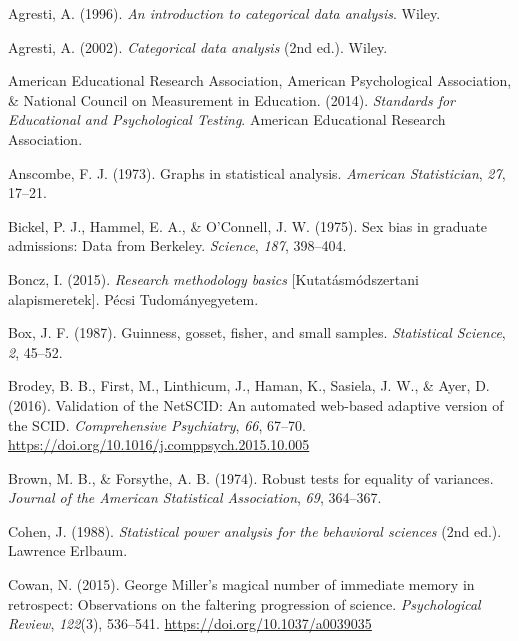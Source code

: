 \documentclass[
  11pt,
  a4paper,
  twoside,symmetric,openright]{book}
\newlength{\cslentryspacing}
\theoremstyle{break}
\theoremstyle{break}
\begin{document}
\label{refs}
\setlength{\cslentryspacing}{0em}
\begin{CSLReferences}
Agresti, A. (1996). \emph{An introduction to categorical data analysis}. Wiley.

Agresti, A. (2002). \emph{Categorical data analysis} (2nd ed.). Wiley.

American Educational Research Association, American Psychological Association, \& National Council on Measurement in Education. (2014). \emph{Standards for {Educational} and {Psychological Testing}}. {American Educational Research Association}.

Anscombe, F. J. (1973). Graphs in statistical analysis. \emph{American Statistician}, \emph{27}, 17--21.

Bickel, P. J., Hammel, E. A., \& O'Connell, J. W. (1975). Sex bias in graduate admissions: Data from {B}erkeley. \emph{Science}, \emph{187}, 398--404.

Boncz, I. (2015). \emph{{Research methodology basics}} {[}Kutatásmódszertani alapismeretek{]}. Pécsi Tudományegyetem.

Box, J. F. (1987). Guinness, gosset, fisher, and small samples. \emph{Statistical Science}, \emph{2}, 45--52.

Brodey, B. B., First, M., Linthicum, J., Haman, K., Sasiela, J. W., \& Ayer, D. (2016). Validation of the {NetSCID}: An automated web-based adaptive version of the {SCID}. \emph{Comprehensive Psychiatry}, \emph{66}, 67--70. \url{https://doi.org/10.1016/j.comppsych.2015.10.005}

Brown, M. B., \& Forsythe, A. B. (1974). Robust tests for equality of variances. \emph{Journal of the American Statistical Association}, \emph{69}, 364--367.

Cohen, J. (1988). \emph{Statistical power analysis for the behavioral sciences} (2nd ed.). Lawrence Erlbaum.

Cowan, N. (2015). George {Miller}'s magical number of immediate memory in retrospect: {Observations} on the faltering progression of science. \emph{Psychological Review}, \emph{122}(3), 536--541. \url{https://doi.org/10.1037/a0039035}


\end{CSLReferences}
\end{document}
